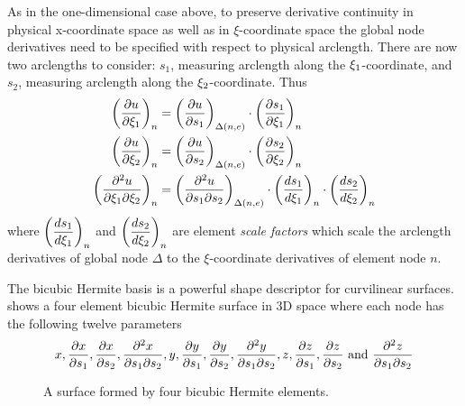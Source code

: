 As in the one-dimensional case above, to preserve derivative continuity in
physical x-coordinate space as well as in $\xi$-coordinate space the global
node derivatives need to be specified with respect to physical arclength.
There are now two arclengths to consider: $s_{1}$, measuring arclength along
the $\xi_{1}$-coordinate, and $s_{2}$, measuring arclength along the 
$\xi_{2}$-coordinate. Thus
\begin{gather}
  \begin{aligned}
    \left(  \dfrac{\partial u}{\partial \xi_{1}}  \right)_{n} &=
    \left(  \dfrac{\partial u}{\partial s_{1}}  \right)_{ \Delta\left( n,e \right) } \cdot
    \left(  \dfrac{\partial s_{1}}{\partial \xi_{1}}  \right)_{n} \\ \left(  \dfrac{\partial u}{\partial \xi_{2}}  \right)_{n} &=
    \left(  \dfrac{\partial u}{\partial s_{2}}  \right)_{ \Delta\left( n,e \right) } \cdot
    \left(  \dfrac{\partial s_{2}}{\partial \xi_{2}}  \right)_{n} \\ 
    \left(  \dfrac{\partial^{2} u}{\partial \xi_{1} \partial \xi_{2}}  \right)_{n} &=
    \left(  \dfrac{\partial^{2} u}{\partial s_{1} \partial s_{2}}  \right)_ { \Delta\left( n,e \right) } \cdot
    \left(  \dfrac{ d s_{1}}{d \xi_{1}}  \right)_{n} \cdot \left(  \dfrac{ d s_{2}}{d \xi_{2}}  \right)_{n}
  \end{aligned}
  \label{eqn:Hbf}
\end{gather}
where $\left(  \dfrac{ d s_{1}}{d \xi_{1}}  \right)_{n}$ and $\left(  \dfrac{ d s_{2}}{d \xi_{2}}  \right)_{n}$
are element \emph{scale factors} which scale the arclength derivatives of
global node $\Delta$ to the $\xi$-coordinate derivatives of element node $n$.

The bicubic Hermite basis is a powerful shape descriptor for curvilinear
surfaces.   shows a four element bicubic Hermite
surface in 3D space where each node has the following twelve parameters
\begin{equation*}
   x,\/  \dfrac{\partial x}{\partial s_{1}} ,\/  \dfrac{\partial x}{\partial s_{2}} ,\/
    \dfrac{\partial^{2} x}{\partial s_{1} \partial s_{2}} ,\/y,\/  \dfrac{\partial y}{\partial s_{1}} ,\/ \dfrac{\partial y}{\partial s_{2}} ,\/
    \dfrac{\partial^{2} y}{\partial s_{1} \partial s_{2}} ,\/  z,\/
    \dfrac{\partial z}{\partial s_{1}} ,\/  \dfrac{\partial z}{\partial s_{2}}  \text{ and }  \dfrac{\partial^{2} z}{\partial s_{1} \partial s_{2}} 
\end{equation*}

\begin{figure}[htbp] \centering
  
  \caption{A surface formed by four bicubic Hermite elements.}
  \label{fig:surface}
\end{figure}



